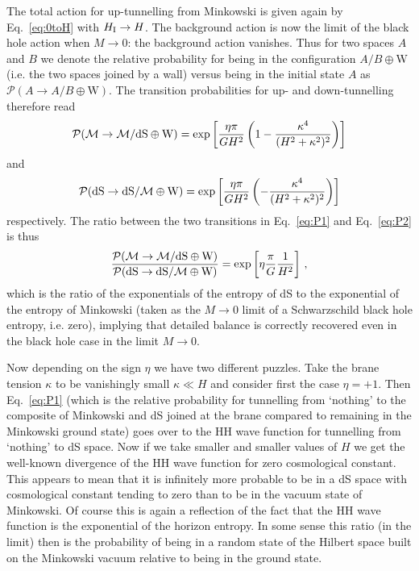 \documentclass[11pt,a4paper]{article}
\begin{document}
The total action for up-tunnelling from Minkowski is given again by Eq.~\eqref{eq:0toH} with $H_{\rm I} \rightarrow H$. The background action is now the limit of the black hole action when $M\rightarrow 0$: the background action vanishes. Thus for two spaces $A$ and $B$ we denote the relative probability for being in the configuration $A/B\oplus \text{W}$ (i.e. the two  spaces joined by a wall) versus being in the initial state $A$ as $\mathcal{P}(A\rightarrow A/B\oplus \text{W})$. The transition probabilities for up- and down-tunnelling therefore read
\begin{equation}
\mathcal{P}(\mathcal{M} \rightarrow \mathcal{M}/{\rm{dS}} \oplus \text{W}) = \exp\left[\frac{\eta \pi}{G H^2} \left(1 -  \frac{\kappa^4}{(H^2 + \kappa^2)^2} \right) \right]  
\label{eq:P1}
\end{equation}
and
\begin{equation}
\mathcal{P} ({\rm{dS}}\rightarrow {\rm{dS}}/\mathcal{M} \oplus \text{W}) = \exp \left[\frac{\eta \pi}{G H^2} \left(- \frac{\kappa^4}{(H^2 + \kappa^2)^2} \right) \right]
\label{eq:P2}
\end{equation}
respectively. The ratio between the two transitions in Eq.~\eqref{eq:P1} and Eq.~\eqref{eq:P2} is thus
\begin{equation}
\frac{\mathcal{P} (\mathcal{M} \rightarrow \mathcal{M}/\rm{dS} \oplus \text{W})}{\mathcal{P} (\rm{dS} \rightarrow \rm{dS}/\mathcal{M} \oplus \text{W})} = \exp \left[\eta\frac{\pi}{G} \frac{1}{H^2} \right] \,,
\end{equation}
which is the ratio of the exponentials of the entropy of dS to the exponential of the entropy of Minkowski (taken as the $M \rightarrow 0$ limit of a Schwarzschild black hole entropy, i.e. zero), implying that detailed balance is correctly recovered even in the black hole case in the limit $M \rightarrow 0$.

Now depending on the sign $\eta$ we have two different puzzles. Take the brane tension $\kappa$ to be vanishingly small  $\kappa\ll H$ and consider first the case $\eta=+1$. Then Eq.~\eqref{eq:P1} (which is the relative probability for tunnelling from `nothing' to the composite of Minkowski and dS joined at the brane compared to remaining in the Minkowski ground state) goes over to the HH wave function for tunnelling from `nothing' to dS space. Now if we take smaller and smaller values of $H$ we get the well-known divergence of the HH wave function for zero cosmological constant. This appears to mean that it is infinitely more probable to be in a dS space with cosmological constant tending to zero than to be in the vacuum state of Minkowski. Of course this is again a reflection of the fact that the HH wave function is the exponential of the horizon entropy. In some sense this ratio (in the limit) then is the probability of being in a random state of the Hilbert space built on the Minkowski vacuum relative to being in the ground state.
\end{document}

